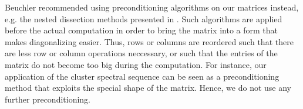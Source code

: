 Beuchler recommended using preconditioning algorithms on our matrices instead, e.g. the nested dissection methods presented in \cite[Chapter 8]{GeorgeLiu1981}.
Such algorithms are applied before the actual computation in order to bring the matrix into a form that makes diagonalizing easier.
Thus, rows or columns are reordered such that there are less row or column operations neccessary, or such that the entries of the matrix do not become too big during the computation.
For instance, our application of the cluster spectral sequence can be seen as a preconditioning method that exploits the special shape of the matrix.
Hence, we do not use any further preconditioning. 